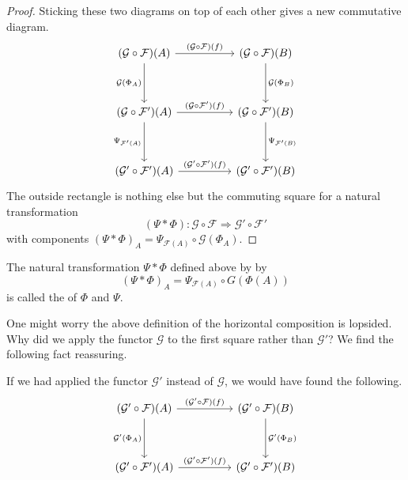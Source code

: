 \documentclass[main.tex]{subfiles}
\begin{document}
\begin{proof}
  Sticking these two diagrams on top of each other gives a new commutative diagram.
  \begin{equation*}
    \begin{tikzcd}[row sep=huge, column sep=huge]
      (\mathcal{G} \circ \mathcal{F})(A)
      \arrow[d, swap, "\mathcal{G}(\Phi_{A})"]
      \arrow[r, "(\mathcal{G} \circ \mathcal{F})(f)"]
      & (\mathcal{G} \circ \mathcal{F})(B)
      \arrow[d, "\mathcal{G}(\Phi_{B})"]
      \\
      (\mathcal{G} \circ \mathcal{F}')(A)
      \arrow[r, "(\mathcal{G} \circ \mathcal{F}')(f)"]
      \arrow[d, swap, "\Psi_{\mathcal{F}'(A)}"]
      & (\mathcal{G} \circ \mathcal{F}')(B)
      \arrow[d, "\Psi_{\mathcal{F}'(B)}"]
      \\
      (\mathcal{G}' \circ \mathcal{F}')(A)
      \arrow[r, "(\mathcal{G}' \circ \mathcal{F}')(f)"]
      & (\mathcal{G}' \circ \mathcal{F}')(B)
    \end{tikzcd}
  \end{equation*}
  The outside rectangle is nothing else but the commuting square for a natural transformation
  \begin{equation*}
    (\Psi * \Phi)\colon \mathcal{G} \circ \mathcal{F} \Rightarrow \mathcal{G'} \circ \mathcal{F}'
  \end{equation*}
  with components ${(\Psi * \Phi)}_{A} = \Psi_{\mathcal{F}(A)} \circ \mathcal{G}(\Phi_{A})$.
\end{proof}

\begin{definition}
  \label{def:horizontalcomposition}
  The natural transformation $\Psi * \Phi$ defined above by by
  \begin{equation*}
    (\Psi * \Phi)_{A} = \Psi_{\mathcal{F}(A)} \circ G(\Phi(A))
  \end{equation*}
  is called the  of $\Phi$ and $\Psi$.
\end{definition}

One might worry the above definition of the horizontal composition is lopsided. Why did we apply the functor $\mathcal{G}$ to the first square rather than $\mathcal{G}'$? We find the following fact reassuring.

If we had applied the functor $\mathcal{G}'$ instead of $\mathcal{G}$, we would have found the following.
\begin{equation*}
  \begin{tikzcd}[row sep=huge, column sep=huge]
    (\mathcal{G}' \circ \mathcal{F})(A)
    \arrow[d, swap, "\mathcal{G}'(\Phi_{A})"]
    \arrow[r, "(\mathcal{G}' \circ \mathcal{F})(f)"]
    & (\mathcal{G}' \circ \mathcal{F})(B)
    \arrow[d, "\mathcal{G}'(\Phi_{B})"]
    \\
    (\mathcal{G}' \circ \mathcal{F}')(A)
    \arrow[r, "(\mathcal{G}' \circ \mathcal{F}')(f)"]
    & (\mathcal{G}' \circ \mathcal{F}')(B)
  \end{tikzcd}
\end{equation*}
\end{document}
